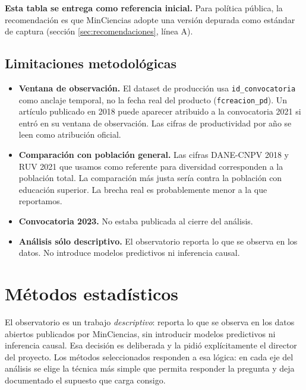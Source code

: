 \documentclass[11pt,a4paper,oneside]{article}
\begin{document}
\textbf{Esta tabla se entrega como referencia inicial.} Para política pública, la recomendación es que MinCiencias adopte una versión depurada como estándar de captura (sección \ref{sec:recomendaciones}, línea A).

\subsection{Limitaciones metodológicas}

\begin{itemize}
\item \textbf{Ventana de observación.} El dataset de producción usa \texttt{id\_convocatoria} como anclaje temporal, no la fecha real del producto (\texttt{fcreacion\_pd}). Un artículo publicado en 2018 puede aparecer atribuido a la convocatoria 2021 si entró en su ventana de observación. Las cifras de productividad por año se leen como atribución oficial.
\item \textbf{Comparación con población general.} Las cifras DANE-CNPV 2018 y RUV 2021 que usamos como referente para diversidad corresponden a la población total. La comparación más justa sería contra la población con educación superior. La brecha real es probablemente menor a la que reportamos.
\item \textbf{Convocatoria 2023.} No estaba publicada al cierre del análisis.
\item \textbf{Análisis sólo descriptivo.} El observatorio reporta lo que se observa en los datos. No introduce modelos predictivos ni inferencia causal.
\end{itemize}

\newpage

\section{Métodos estadísticos}\label{sec:metodos}

El observatorio es un trabajo \emph{descriptivo}: reporta lo que se observa en los datos abiertos publicados por MinCiencias, sin introducir modelos predictivos ni inferencia causal. Esa decisión es deliberada y la pidió explícitamente el director del proyecto. Los métodos seleccionados responden a esa lógica: en cada eje del análisis se elige la técnica más simple que permita responder la pregunta y deja documentado el supuesto que carga consigo.
\end{document}

